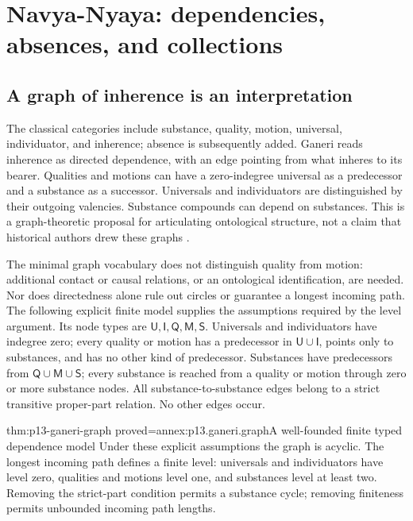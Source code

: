 \section{Navya-Nyaya: dependencies, absences, and collections}
\label{sec:p13-ganeri-navya}

\subsection{A graph of inherence is an interpretation}

The classical categories include substance, quality, motion, universal,
individuator, and inherence; absence is subsequently added. Ganeri reads
inherence as directed dependence, with an edge pointing from what inheres
to its bearer. Qualities and motions can have a zero-indegree universal
as a predecessor and a substance as a successor. Universals and individuators
are distinguished by their outgoing valencies. Substance compounds can
depend on substances. This is a graph-theoretic proposal for articulating
ontological structure, not a claim that historical authors drew these graphs
\cite[pp.~370--377]{Ganeri2004IndianLogicPublished}.

The minimal graph vocabulary does not distinguish quality from motion:
additional contact or causal relations, or an ontological identification,
are needed. Nor does directedness alone rule out circles or guarantee
a longest incoming path. The following explicit finite model supplies
the assumptions required by the level argument. Its node types are
\(\mathsf U,\mathsf I,\mathsf Q,\mathsf M,\mathsf S\).
Universals and individuators have indegree zero; every quality or motion
has a predecessor in \(\mathsf U\cup\mathsf I\), points only to substances,
and has no other kind of predecessor. Substances have predecessors from
\(\mathsf Q\cup\mathsf M\cup\mathsf S\); every substance is reached from
a quality or motion through zero or more substance nodes.
All substance-to-substance edges belong to a strict transitive
proper-part relation. No other edges occur.

\begin{hblemma}{thm:p13-ganeri-graph}
 {proved=annex:p13.ganeri.graph}{A well-founded finite typed dependence model}
Under these explicit assumptions the graph is acyclic. The longest incoming
path defines a finite level: universals and individuators have level zero,
qualities and motions level one, and substances level at least two.
Removing the strict-part condition permits a substance cycle; removing
finiteness permits unbounded incoming path lengths.
\end{hblemma}

